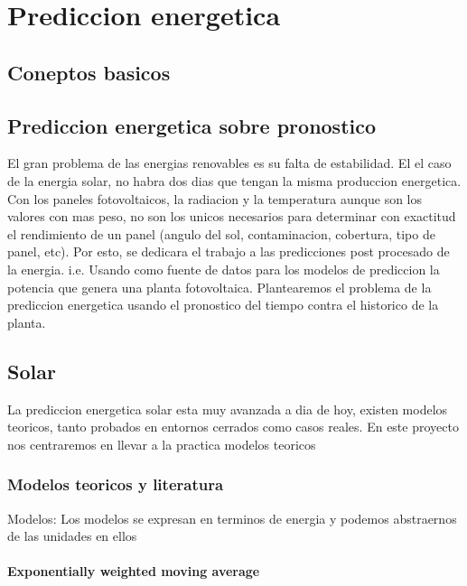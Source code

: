 \chapter{Prediccion energetica} %
\label{cha:Prediccion energetica}



\section{Coneptos basicos} %
\label{sec:coneptos_basicos}

\section{Prediccion energetica sobre pronostico} %
\label{sec:prediccion_energetica_sobre_pronostico}
El gran problema de las energias renovables es su falta de estabilidad. El el caso de la energia solar, no habra dos dias que tengan la misma produccion energetica.
Con los paneles fotovoltaicos, la radiacion y la temperatura aunque son los valores con mas peso, no son los unicos necesarios para determinar con exactitud el rendimiento de un panel (angulo del sol, contaminacion, cobertura, tipo de panel, etc).
Por esto, se dedicara el trabajo a las predicciones post procesado de la energia. i.e. Usando como fuente de datos para los modelos de prediccion la potencia que genera una planta fotovoltaica.
Plantearemos el problema de la prediccion energetica usando el pronostico del tiempo contra el historico de la planta.

\section{Solar} %
\label{sec:solar}
La prediccion energetica solar esta muy avanzada a dia de hoy, existen modelos teoricos, tanto probados en entornos cerrados como casos reales. 
En este proyecto nos centraremos en llevar a la practica modelos teoricos

\subsection{Modelos teoricos y literatura} %
\label{sub:modelos_teoricos_y_literatura}
Modelos:
Los modelos se expresan en terminos de energia y podemos abstraernos de las unidades en ellos


\subsubsection{ Exponentially weighted moving average} %
\label{ssub:subsubsection_name}

